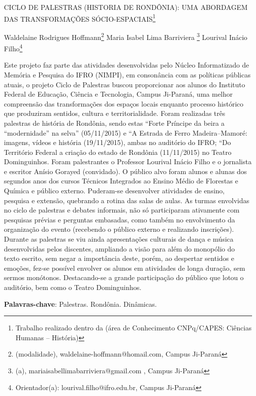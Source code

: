 \documentclass[article,12pt,onesidea,4paper,english,brazil]{abntex2}
\begin{document}
	
	
	\frenchspacing 
	
	\begin{center}
		\LARGE CICLO DE PALESTRAS (HISTORIA DE RONDÔNIA): UMA ABORDAGEM DAS TRANSFORMAÇÕES SÓCIO-ESPACIAIS\footnote{Trabalho realizado dentro da (área de Conhecimento CNPq/CAPES: Ciências Humanas – História)}
		
		\normalsize
		Waldelaine Rodrigues Hoffmann\footnote{(modalidade), waldelaine-hoffmann@homail.com,  Campus Ji-Paraná} 
		Maria Isabel Lima Barriviera \footnote{(a), mariaisabellimabarriviera@gmail.com , Campus Ji-Paraná} 
		Lourival Inácio Filho\footnote{Orientador(a):  lourival.filho@ifro.edu.br,  Campus Ji-Paraná}  
	\end{center}
	
	\noindent Este projeto faz parte das atividades desenvolvidas pelo Núcleo Informatizado de Memória e Pesquisa do IFRO (NIMPI), em consonância com as políticas públicas atuais, o projeto Ciclo de Palestras buscou proporcionar aos alunos do Instituto Federal de Educação, Ciência e Tecnologia, Campus Ji-Paraná, uma melhor compreensão das transformações dos espaços locais enquanto processo histórico que produziram sentidos, cultura e territorialidade. Foram realizadas três palestras de história de Rondônia, sendo estas “Forte Príncipe da beira a “modernidade” na selva” (05/11/2015) e “A Estrada de Ferro Madeira–Mamoré: imagens, vídeos e história (19/11/2015), ambas no auditório do IFRO; “Do Território Federal a criação do estado de Rondônia (11/11/2015) no Teatro Dominguinhos. Foram palestrantes o Professor Lourival Inácio Filho e o jornalista e escritor Anísio Gorayed (convidado). O público alvo foram alunos e alunas dos segundos anos dos cursos Técnicos Integrados ao Ensino Médio de Florestas e Química e público externo. Puderam-se desenvolver atividades de ensino, pesquisa e extensão, quebrando a rotina das salas de aulas. As turmas envolvidas no ciclo de palestras e debates informais, não só participaram ativamente com pesquisas prévias e perguntas embasadas, como também no envolvimento da organização do evento (recebendo o público externo e realizando inscrições). Durante as palestras se viu ainda apresentações culturais de dança e música desenvolvidas pelos discentes, ampliando a visão para além do monopólio do texto escrito, sem negar a importância deste, porém, ao despertar sentidos e emoções, fez-se possível envolver os alunos em atividades de longa duração, sem sermos monótonos. Destacando-se a grande participação do público que lotou o auditório, bem como o Teatro Dominguinhos.
	
	\vspace{\onelineskip}
	
	\noindent
	\textbf{Palavras-chave}: Palestras. Rondônia. Dinâmicas.
	
\end{document}
